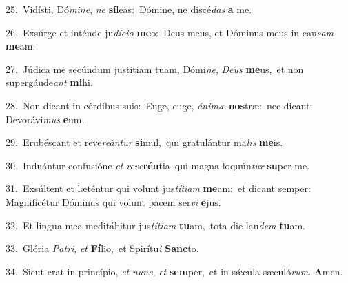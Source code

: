 {\numbfont\textcolor{\numbcolor}{25.}}~Vidísti, Dó\-\textit{mi}\-\textit{ne}, \textit{ne} \textbf{sí}\-leas:~\star Dómine, ne discé\textit{das} \textbf{a} me.\par
{\numbfont\textcolor{\numbcolor}{26.}}~Exsúrge et inténde ju\-\textit{dí}\-\textit{ci}\textit{o} \textbf{me}\-o:~\star Deus meus, et Dóminus meus in cau\textit{sam} \textbf{me}\-am.\par
{\numbfont\textcolor{\numbcolor}{27.}}~Júdica me secúndum justítiam tuam, Dómi\-\textit{ne}\-, \textit{De}\-\textit{us} \textbf{me}\-us,~\star et non supergáude\textit{ant} \textbf{mi}\-hi.\par
{\numbfont\textcolor{\numbcolor}{28.}}~Non dicant in córdibus suis:~\dagger Euge, euge, \textit{á}\-\textit{ni}\textit{mæ} \textbf{nos}\-træ:~\star nec dicant: Devorávi\textit{mus} \textbf{e}\-um.\par
{\numbfont\textcolor{\numbcolor}{29.}}~Erubéscant et reve\-\textit{re}\-\textit{án}\textit{tur} \textbf{si}\-mul,~\star qui gratulántur ma\textit{lis} \textbf{me}\-is.\par
{\numbfont\textcolor{\numbcolor}{30.}}~Induántur confusióne \textit{et} \textit{re}\-\textit{ve}\textbf{rén}tia~\star qui magna loquún\textit{tur} \textbf{su}\-per me.\par
{\numbfont\textcolor{\numbcolor}{31.}}~Exsúltent et læténtur qui volunt jus\-\textit{tí}\-\textit{ti}\textit{am} \textbf{me}\-am:~\star et dicant semper: Magnificétur Dóminus qui volunt pacem ser\textit{vi} \textbf{e}\-jus.\par
{\numbfont\textcolor{\numbcolor}{32.}}~Et lingua mea meditábitur jus\-\textit{tí}\-\textit{ti}\textit{am} \textbf{tu}\-am,~\star tota die lau\textit{dem} \textbf{tu}\-am.\par
{\numbfont\textcolor{\numbcolor}{33.}}~Glória \textit{Pa}\-\textit{tri}, \textit{et} \textbf{Fí}\-lio,~\star et Spirítu\textit{i} \textbf{Sanc}\-to.\par
{\numbfont\textcolor{\numbcolor}{34.}}~Sicut erat in princípio, \textit{et} \textit{nunc}\-, \textit{et} \textbf{sem}\-per,~\star et in sǽcula sæculó\-\textit{rum}\-. \textbf{A}\-men.\par
